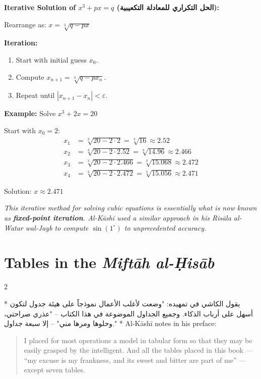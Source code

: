 \documentclass[11pt,a4paper]{article}
\newcommand{\cnote}[1]{\textcolor{notecolor}{\textit{#1}}}
\newcommand{\ar}[1]{\arabicfont\beginR #1\endR}
\newenvironment{bilingual}{%
  \vspace{0.3em}%
  \begin{paracol}{2}%
}{%
  \end{paracol}%
  \vspace{0.3em}%
}
\newenvironment{mathalgo}{%
  \par\vspace{0.3cm}
  \begin{framed}
  \setlength{\parindent}{0pt}
}{%
  \end{framed}
  \par\vspace{0.3cm}
}
\begin{document}
\begin{mathalgo}
\textbf{Iterative Solution of $x^3 + px = q$ (\ar{الحل التكراري للمعادلة التكعيبية}):}

Rearrange as: $x = \sqrt[3]{q - px}$

\textbf{Iteration:}
\begin{enumerate}[nosep]
  \item Start with initial guess $x_0$.
  \item Compute $x_{n+1} = \sqrt[3]{q - p x_n}$.
  \item Repeat until $|x_{n+1} - x_n| < \varepsilon$.
\end{enumerate}

\textbf{Example:} Solve $x^3 + 2x = 20$

Start with $x_0 = 2$:
\begin{align*}
x_1 &= \sqrt[3]{20 - 2 \cdot 2} = \sqrt[3]{16} \approx 2.52 \\
x_2 &= \sqrt[3]{20 - 2 \cdot 2.52} = \sqrt[3]{14.96} \approx 2.466 \\
x_3 &= \sqrt[3]{20 - 2 \cdot 2.466} = \sqrt[3]{15.068} \approx 2.472 \\
x_4 &= \sqrt[3]{20 - 2 \cdot 2.472} = \sqrt[3]{15.056} \approx 2.471
\end{align*}

Solution: $\boxed{x \approx 2.471}$
\end{mathalgo}

\cnote{This iterative method for solving cubic equations is essentially
what is now known as \textbf{fixed-point iteration}. Al-K\=ash\=i used a
similar approach in his \textit{Ris\=ala al-Watar wal-Jayb} to compute
$\sin(1^\circ)$ to unprecedented accuracy.}
\clearpage

\section{Tables in the \textit{Mift\=ah al-\d{H}is\=ab}}
\label{sec:tables}

\begin{bilingual}
\switchcolumn[0]*
\ar{يقول الكاشي في تمهيده: "وضعت لأغلب الأعمال نموذجاً على هيئة جدول لتكون أسهل على أرباب الذكاء. وجميع الجداول الموضوعة في هذا الكتاب -- "عذري صراحتي، وحلوها ومرها مني" -- إلا سبعة جداول."}
\switchcolumn[1]*
Al-K\=ash\=i notes in his preface:
\begin{quote}
I placed for most operations a model in tabular form so that they may
be easily grasped by the intelligent. And all the tables placed in
this book --- ``my excuse is my frankness, and its sweet and bitter
are part of me'' --- except seven tables.
\end{quote}
\end{bilingual}
\end{document}
